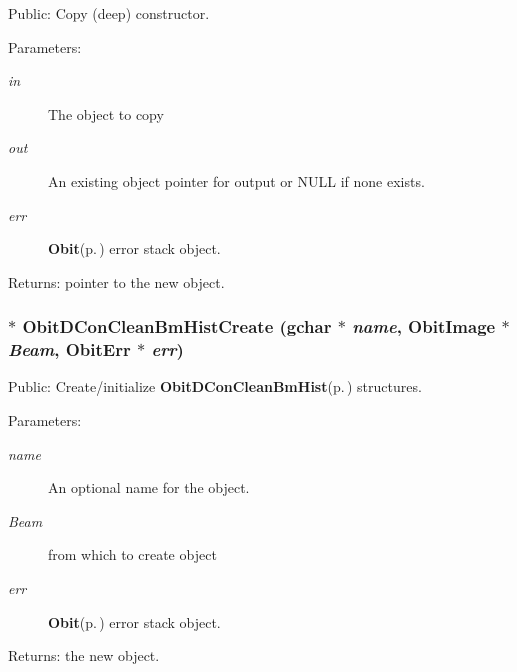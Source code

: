 Public: Copy (deep) constructor. 

\begin{Desc}
\item[Parameters:]
\begin{description}
\item[{\em in}]The object to copy \item[{\em out}]An existing object pointer for output or NULL if none exists. \item[{\em err}]{\bf Obit}{\rm (p.\,\pageref{structObit})} error stack object. \end{description}
\end{Desc}
\begin{Desc}
\item[Returns:]pointer to the new object. \end{Desc}
\subsubsection{$\ast$ Obit\-DCon\-Clean\-Bm\-Hist\-Create (gchar $\ast$ {\em name}, {\bf Obit\-Image} $\ast$ {\em Beam}, {\bf Obit\-Err} $\ast$ {\em err})}\label{ObitDConCleanBmHist_8c_a10}


Public: Create/initialize {\bf Obit\-DCon\-Clean\-Bm\-Hist}{\rm (p.\,\pageref{structObitDConCleanBmHist})} structures. 

\begin{Desc}
\item[Parameters:]
\begin{description}
\item[{\em name}]An optional name for the object. \item[{\em Beam}]from which to create object \item[{\em err}]{\bf Obit}{\rm (p.\,\pageref{structObit})} error stack object. \end{description}
\end{Desc}
\begin{Desc}
\item[Returns:]the new object. \end{Desc}
